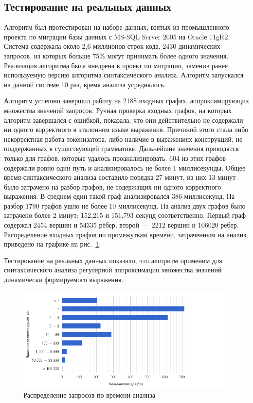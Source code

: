 \subsection{Тестирование на реальных данных}
Алгоритм был протестирован на наборе данных, взятых из промышленного проекта по миграции базы данных с MS-SQL Server 2005 на Oraclе 11gR2. Система содержала около 2,6 миллионов строк кода, 2430 динамических запросов, из которых больше 75\% могут принимать более одного значения. Реализация алгоритма была внедрена в проект по миграции, заменив ранее используемую версию алгоритма синтаксического анализа. Алгоритм запускался на данной системе 10 раз, время анализа усреднялось. 

Алгоритм успешно завершил работу на 2188 входных графах, аппроксимирующих множества значений запросов. Ручная проверка входных графов, на которых алгоритм завершался с ошибкой, показала, что они действительно не содержали ни одного корректного в эталонном языке выражения. Причиной этого стала либо некорректная работа токенизатора, либо наличие в выражениях конструкций, не поддержанных в существующей грамматике. Дальнейшие значения приводятся только для графов, которые удалось проанализировать. 604 из этих графов содержали ровно один путь и анализировалось не более 1 миллисекунды. Общее время синтаксического анализа составило порядка 27 минут, из них 13 минут было затрачено на разбор графов, не содержащих ни одного корректного выражения. В среднем один такой граф анализировался 386 миллисекунд. На разбор 1790 графов ушло не более 10 миллисекунд. На анализ двух графов было затрачено более 2 минут: 152,215 и 151,793 секунд соответственно. Первый граф содержал 2454 вершин и 54335 рёбер, второй~--- 2212 вершин и 106020 рёбер. Распределение входных графов по промежуткам времени, затраченным на анализ, приведено на графике на рис.~\ref{distr}.

Тестирование на реальных данных показало, что алгоритм применим для синтаксического анализа регулярной аппроксимации множества значений динамически формируемого выражения.

\begin{figure}[H]
  \centering
 \includegraphics[width=\textwidth]{Verbitskaya/pics/distr.png}
 \caption{Распределение запросов по времени анализа}
 \label{distr}
\end{figure}

